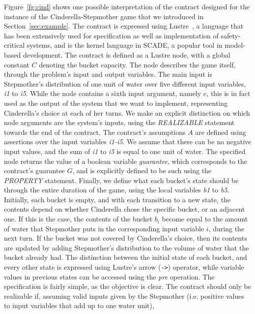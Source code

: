Figure~\ref{fg:cind} shows one possible interpretation of the contract designed
for the instance of the Cinderella-Stepmother game that we introduced in Section~\ref{sec:example}. The contract
is expressed using Lustre~\cite{lustrev6}, a language
that has been extensively used for specification as well as implementation of
safety-critical systems, and is the kernel language in SCADE, a popular tool in
model-based development. The contract is defined as a Lustre node, with a global
constant $C$ denoting the bucket capacity. The node describes the game itself,
through the problem's input and output variables. The main input is Stepmother's
distribution of one unit of water over five different input variables,
\textit{i1} to \textit{i5}. While the node contains a sixth input argument,
namely $e$, this is in fact used as the output of the system that we want to
implement, representing Cinderella's choice at each of her turns. We make an
explicit distinction on which node arguments are the system's inputs, using the \textit{REALIZABLE} statement towards the end of the contract. The contract's
assumptions $A$ are defined using assertions over the input variables
\textit{i1-i5}. We assume that there can be no negative input values, and the
sum of \textit{i1} to \textit{i5} is equal to one unit of water. The specified node
returns the value of a boolean variable \textit{guarantee}, which corresponds to
the contract's guarantee $G$, and is explicitly defined to be such using the
\textit{PROPERTY} statement.
Finally, we define what each bucket's state should be through the entire
duration of the game, using the local variables \textit{b1} to \textit{b5}.
Initially, each bucket is empty, and with each transition to a new state, the contents depend on
whether Cinderella chose the specific bucket, or an adjacent one. If this is the
case, the contents of the bucket $b_i$ become equal to the amount of water that
Stepmother puts in the corresponding input variable $i$, during the next turn.
If the bucket was not covered by Cinderella's choice, then its contents are
updated by adding Stepmother's distribution to the volume of water that the
bucket already had. The distinction between the initial state of each bucket,
and every other state is expressed using Lustre's arrow (\texttt{->})
operator, while variable values in previous states can be accessed using the
\textit{pre} operation.
The specification is fairly simple, as the objective is clear. The contract
should only be realizable if, assuming valid inputs given by the Stepmother
(i.e. positive values to input variables that add up to one water unit),
